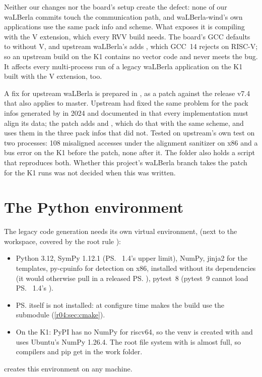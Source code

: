 Neither our changes nor the board's setup create the defect: none of our waLBerla
commits touch the communication path, and waLBerla-wind's own applications use the same
pack info and scheme. What exposes it is compiling with the V extension, which every RVV
build needs. The board's GCC defaults to  without V, and upstream
waLBerla's  adds , which GCC~14 rejects
on RISC-V; so an upstream build on the K1 contains no vector code and never meets the
bug. It affects every multi-process run of a legacy waLBerla application on the K1
built with the V extension,  too.

A fix for upstream waLBerla is prepared in ,
as a patch against the release v7.4 that also applies to master. Upstream had fixed the
same problem for the pack infos generated by  in 2024 and
documented in  that every implementation must align its data; the
patch adds  and , which do
that with the same scheme, and uses them in the three pack infos that did not. Tested on
upstream's own test  on two processes: 108 misaligned accesses
under the alignment sanitizer on x86 and a bus error on the K1 before the patch, none
after it. The folder also holds a script that reproduces both. Whether this project's
waLBerla branch takes the patch for the K1 runs was not decided when this was written.

\section{The Python environment}\label{r04:sec:env}

The legacy code generation needs its own virtual environment, 
(next to the workspace, covered by the root  rule ):
\begin{itemize}
  \item Python 3.12, SymPy 1.12.1 (\ps{}~1.4's upper limit), NumPy, jinja2 for the
    templates, py-cpuinfo for detection on x86,  installed without its
    dependencies (it would otherwise pull in a released \ps{}), pytest~8 (pytest~9 cannot
    load \ps{}~1.4's ).
  \item \ps{} itself is not installed:  at
    configure time makes the build use the submodule (\cref{r04:sec:cmake}).
  \item On the K1: PyPI has no NumPy for riscv64, so the venv is created with
     and uses Ubuntu's NumPy 1.26.4. The root file system
    with  is almost full, so compilers and pip get  in the work
    folder.
\end{itemize}
 creates this environment on any machine.
